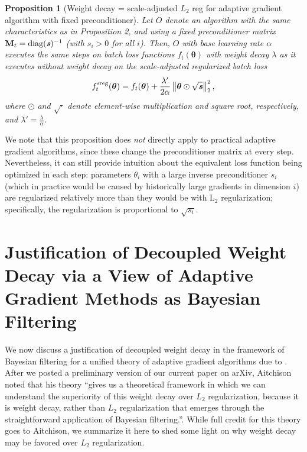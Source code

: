 \documentclass[usenames,dvipsnames]{article} %
\newcommand{\norm}[1]{\left\lVert#1\right\rVert}
\newtheorem{prop}{Proposition}
\newcommand{\vc}[1]{\textit{\textbf{#1}}}
\begin{document}
\begin{prop}[Weight decay = scale-adjusted $L_2$ reg for adaptive gradient algorithm with fixed preconditioner]
Let $O$ denote an algorithm with the same characteristics as in Proposition 2, and using a fixed preconditioner matrix $\textbf{M}_t = \text{diag}(\vc{s})^{-1}$ (with $s_i>0$ for all $i$).
Then, $O$ with base learning rate $\alpha$ executes the same steps on batch loss functions $f_t(\bm{\theta})$ with weight decay $\lambda$ as it executes without weight decay on the scale-adjusted regularized batch loss 
\vspace*{-0.2cm}
\begin{equation}f_{t}^{\text{sreg}}(\bm{\theta}) = f_t(\bm{\theta}) + \frac{\lambda'}{2\alpha} \norm{\bm{\theta} \odot{} \sqrt{\vc{s}}}_2^2,\vspace*{-0.1cm}
\end{equation}
where $\odot$ and $\sqrt{\cdot}$ denote element-wise multiplication and square root, respectively, and $\lambda' = \frac{\lambda}{\alpha}$.
\end{prop}

We note that this proposition does \emph{not} directly apply to practical adaptive gradient algorithms, since these change the preconditioner matrix at every step. Nevertheless, it can still provide intuition about the equivalent loss function being optimized in each step: parameters $\theta_i$ with a large inverse preconditioner $s_i$ (which in practice would be caused by historically large gradients in dimension $i$) are regularized relatively more than they would be with L$_2$ regularization; specifically, the regularization is proportional to $\sqrt{s_i}$. 


\section{Justification of Decoupled Weight Decay via a View of Adaptive Gradient Methods as Bayesian Filtering}
\label{sec:justification}

We now discuss a justification of decoupled weight decay in the framework of Bayesian filtering for a unified theory of adaptive gradient algorithms due to \citet{aitchison18}.
After we posted a preliminary version of our current paper on arXiv, Aitchison noted that his theory ``gives us a theoretical framework in which we can understand the superiority of this weight decay over $L_2$ regularization, because it is weight decay, rather than $L_2$ regularization that emerges through the straightforward application of Bayesian filtering.''\citep{aitchison18}.
While full credit for this theory goes to Aitchison, we summarize it here to shed some light on why weight decay may be favored over $L_2$ regularization.
\end{document}

